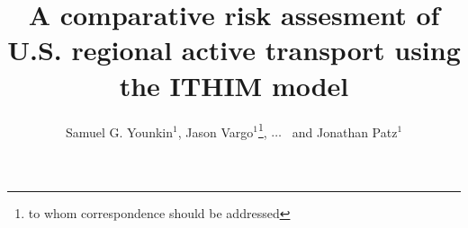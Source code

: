\documentclass{bioinfo}
\newcommand{\package}{\emph{ITHIM}}
\begin{document}

\title[\package{}]{A comparative risk assesment of U.S. regional
  active transport using the ITHIM model}
\author[Younkin \textit{et~al}]{Samuel G. Younkin$^{1}$,
  Jason Vargo$^{1}$\footnote{to whom correspondence should be addressed},
  $\ldots$
  \ and Jonathan Patz$^{1}$}
\address{$^{1}$Global Health Institute\\
University of Wisconsin{\textendash}Madison, Madison, WI USA\\
}


\maketitle
\end{document}
